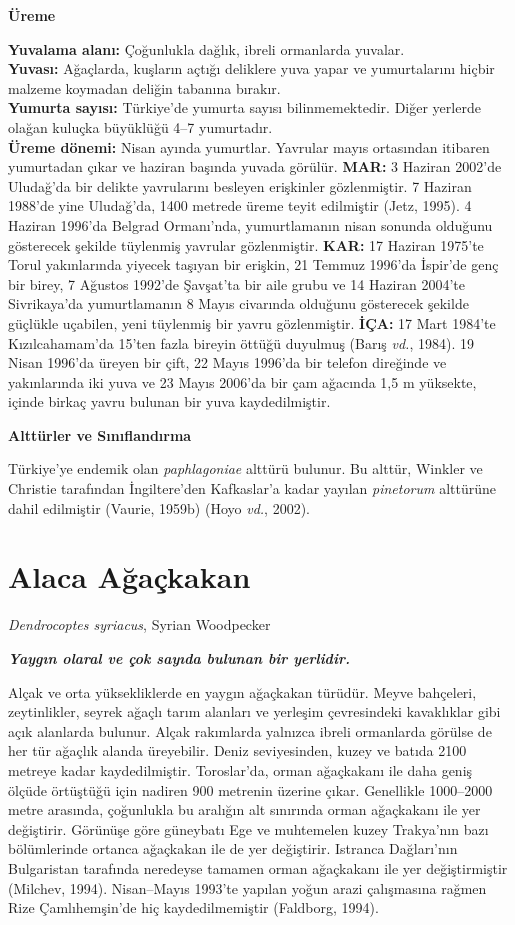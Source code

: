 \documentclass[
  10.5pt,
  a4paper,
  DIV=11,
  numbers=noendperiod,
  twocolumn]{scrreprt}
\begin{document}
\textbf{Üreme}

\textbf{Yuvalama alanı:} Çoğunlukla dağlık, ibreli ormanlarda yuvalar.\\
\textbf{Yuvası:} Ağaçlarda, kuşların açtığı deliklere yuva yapar ve
yumurtalarını hiçbir malzeme koymadan deliğin tabanına bırakır.\\
\textbf{Yumurta sayısı:} Türkiye'de yumurta sayısı bilinmemektedir.
Diğer yerlerde olağan kuluçka büyüklüğü 4--7 yumurtadır.\\
\textbf{Üreme dönemi:} Nisan ayında yumurtlar. Yavrular mayıs ortasından
itibaren yumurtadan çıkar ve haziran başında yuvada görülür.
\textbf{MAR:} 3 Haziran 2002'de Uludağ'da bir delikte yavrularını
besleyen erişkinler gözlenmiştir. 7 Haziran 1988'de yine Uludağ'da, 1400
metrede üreme teyit edilmiştir (Jetz, 1995). 4 Haziran 1996'da Belgrad
Ormanı'nda, yumurtlamanın nisan sonunda olduğunu gösterecek şekilde
tüylenmiş yavrular gözlenmiştir. \textbf{KAR:} 17 Haziran 1975'te Torul
yakınlarında yiyecek taşıyan bir erişkin, 21 Temmuz 1996'da İspir'de
genç bir birey, 7 Ağustos 1992'de Şavşat'ta bir aile grubu ve 14 Haziran
2004'te Sivrikaya'da yumurtlamanın 8 Mayıs civarında olduğunu gösterecek
şekilde güçlükle uçabilen, yeni tüylenmiş bir yavru gözlenmiştir.
\textbf{İÇA:} 17 Mart 1984'te Kızılcahamam'da 15'ten fazla bireyin
öttüğü duyulmuş (Barış \emph{vd.}, 1984). 19 Nisan 1996'da üreyen bir
çift, 22 Mayıs 1996'da bir telefon direğinde ve yakınlarında iki yuva ve
23 Mayıs 2006'da bir çam ağacında 1,5 m yüksekte, içinde birkaç yavru
bulunan bir yuva kaydedilmiştir.

\textbf{Alttürler ve Sınıflandırma}

Türkiye'ye endemik olan \emph{paphlagoniae} alttürü bulunur. Bu alttür,
Winkler ve Christie tarafından İngiltere'den Kafkaslar'a kadar yayılan
\emph{pinetorum} alttürüne dahil edilmiştir (Vaurie, 1959b) (Hoyo
\emph{vd.}, 2002).

\section{Alaca Ağaçkakan}\label{alaca-aux11fauxe7kakan}

\emph{Dendrocoptes syriacus}, Syrian Woodpecker

\textbf{\emph{Yaygın olaral ve çok sayıda bulunan bir yerlidir.}}

Alçak ve orta yüksekliklerde en yaygın ağaçkakan türüdür. Meyve
bahçeleri, zeytinlikler, seyrek ağaçlı tarım alanları ve yerleşim
çevresindeki kavaklıklar gibi açık alanlarda bulunur. Alçak rakımlarda
yalnızca ibreli ormanlarda görülse de her tür ağaçlık alanda üreyebilir.
Deniz seviyesinden, kuzey ve batıda 2100 metreye kadar kaydedilmiştir.
Toroslar'da, orman ağaçkakanı ile daha geniş ölçüde örtüştüğü için
nadiren 900 metrenin üzerine çıkar. Genellikle 1000--2000 metre
arasında, çoğunlukla bu aralığın alt sınırında orman ağaçkakanı ile yer
değiştirir. Görünüşe göre güneybatı Ege ve muhtemelen kuzey Trakya'nın
bazı bölümlerinde ortanca ağaçkakan ile de yer değiştirir. Istranca
Dağları'nın Bulgaristan tarafında neredeyse tamamen orman ağaçkakanı ile
yer değiştirmiştir (Milchev, 1994). Nisan--Mayıs 1993'te yapılan yoğun
arazi çalışmasına rağmen Rize Çamlıhemşin'de hiç kaydedilmemiştir
(Faldborg, 1994).
\end{document}
